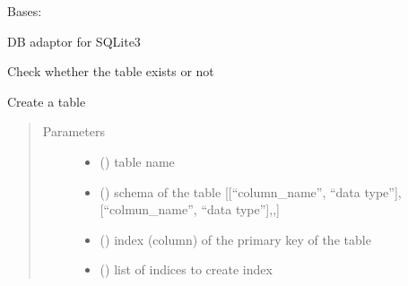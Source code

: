 \documentclass[letterpaper,10pt,english]{sphinxmanual}
\begin{document}
\begin{fulllineitems}
\label{\detokenize{bbc1.core.data_handler:bbc1.core.data_handler.SqliteAdaptor}}
Bases: 

DB adaptor for SQLite3

\begin{fulllineitems}
\label{\detokenize{bbc1.core.data_handler:bbc1.core.data_handler.SqliteAdaptor.check_table_existence}}
Check whether the table exists or not

\end{fulllineitems}


\begin{fulllineitems}
\label{\detokenize{bbc1.core.data_handler:bbc1.core.data_handler.SqliteAdaptor.create_table}}
Create a table
\begin{quote}\begin{description}
\item[{Parameters}] \leavevmode\begin{itemize}
\item {} 
 () \textendash{} table name

\item {} 
 () \textendash{} schema of the table {[}{[}“column\_name”, “data type”{]},{[}“colmun\_name”, “data type”{]},,{]}

\item {} 
 () \textendash{} index (column) of the primary key of the table

\item {} 
 () \textendash{} list of indices to create index


\end{itemize}
\end{description}
\end{quote}
\end{fulllineitems}
\end{fulllineitems}
\end{document}
